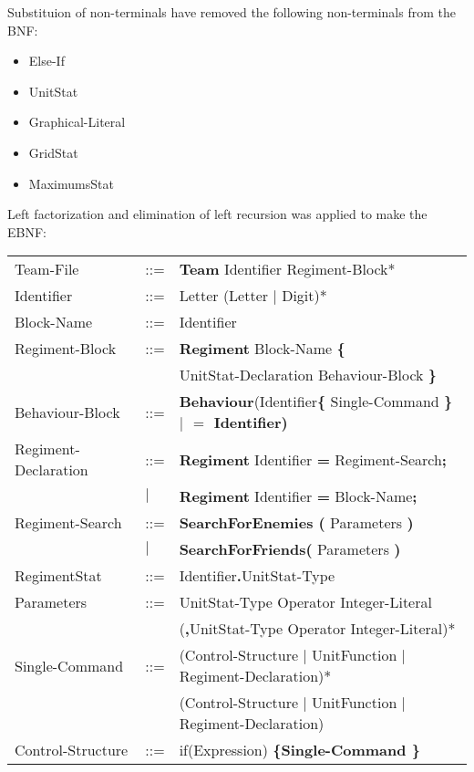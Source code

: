 		Substituion of non-terminals have removed the following non-terminals from the BNF: \\
		\begin{itemize}
			\item Else-If
			\item UnitStat
			\item Graphical-Literal
			\item GridStat
			\item MaximumsStat
		\end{itemize}
		
		Left factorization and elimination of left recursion was applied to make the EBNF: \\
		\begin{center}
			\begin{longtable}{ l l l }
				\endfirsthead
				\endhead
		Team-File					&	::=	&{\bf Team} Identifier Regiment-Block*\\
		Identifier					&	::=	&Letter (Letter $\mid$ Digit)*\\
		Block-Name					&	::=	&Identifier\\
		Regiment-Block				&	::=	&{\bf Regiment} Block-Name {\bf \{ } \\
									&		&UnitStat-Declaration Behaviour-Block \bf{\} }\\
		Behaviour-Block				&	::=	&{\bf Behaviour}(Identifier{\bf \{ }Single-Command \bf{\} } $\mid$ {\bf $=$} Identifier)\\
		Regiment-Declaration		&	::=	&{\bf Regiment} Identifier {\bf =} Regiment-Search{\bf ;}\\
									&$\mid$	&{\bf Regiment} Identifier {\bf =} Block-Name{\bf ;}\\
		Regiment-Search				&	::=	&{\bf SearchForEnemies (} Parameters {\bf )}\\
									&$\mid$	&{\bf SearchForFriends(} Parameters {\bf )}\\
		RegimentStat				&	::=	&Identifier{\bf.}UnitStat-Type \\
		Parameters					&	::=	&UnitStat-Type Operator Integer-Literal\\
									&		&({\bf ,}UnitStat-Type Operator Integer-Literal)*\\
		Single-Command				&	::=	&(Control-Structure $\mid$ UnitFunction $\mid$ Regiment-Declaration)*\\
									&		&(Control-Structure $\mid$ UnitFunction $\mid$ Regiment-Declaration)\\		
		Control-Structure			&	::=	&if(Expression) \bf{\{}Single-Command \bf{\}}\\

\end{longtable}
\end{center}
